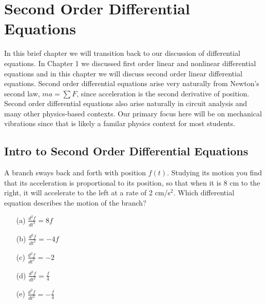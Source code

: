\chapter{Second Order Differential Equations}
In this brief chapter we will transition back to our discussion of differential equations.
In Chapter 1 we discussed first order linear and nonlinear differential equations and in
this chapter we will discuss second order linear differential equations.  Second order
differential equations arise very naturally from Newton's second law, $ma = \sum F$, since
acceleration is the second derivative of position.  Second order differential equations
also arise naturally in circuit analysis and many other physics-based contexts.  Our
primary focus here will be on mechanical vibrations since that is likely a familar physics
context for most students.

\section{Intro to Second Order Differential Equations}

\begin{problem}
    A branch sways back and forth with position $f(t)$.  Studying its motion you find that
    its acceleration is proportional to its position, so that when it is 8 cm to the
    right, it will accelerate to the left at a rate of 2 cm/s$^2$.  Which differential
    equation describes the motion of the branch?

\begin{enumerate}
    \item[(a)] $\frac{d^2 f}{dt^2} = 8f$
    \item[(b)] $\frac{d^2 f}{dt^2} = -4f$
    \item[(c)] $\frac{d^2 f}{dt^2} = -2$
    \item[(d)] $\frac{d^2 f}{dt^2} = \frac{f}{4}$
    \item[(e)] $\frac{d^2 f}{dt^2} = -\frac{f}{4}$
\end{enumerate}
\end{problem}
%             


